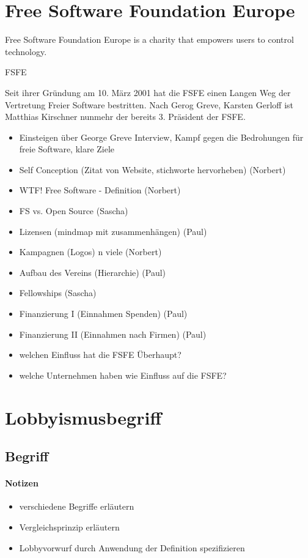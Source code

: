 \newpage
\section{Free Software Foundation Europe}
\epigraph{Free Software Foundation Europe is a charity that empowers users to control technology.}{FSFE}
Seit ihrer Gründung am 10. März 2001 hat die FSFE einen Langen Weg der Vertretung Freier Software bestritten. Nach Gerog Greve, Karsten Gerloff ist Matthias Kirschner nunmehr der bereits 3. Präsident der FSFE.

\begin{itemize}
\setlength\itemsep{0em}
\item Einsteigen über George Greve Interview, Kampf gegen die Bedrohungen für freie Software, klare Ziele
\item Self Conception (Zitat von Website, stichworte hervorheben) (Norbert)
\item WTF! Free Software - Definition (Norbert)
\item FS vs. Open Source (Sascha)
\item Lizensen (mindmap mit zusammenhängen) (Paul)
\item Kampagnen (Logos) n viele (Norbert)
\item Aufbau des Vereins (Hierarchie) (Paul)
\item Fellowships (Sascha)
\item Finanzierung I (Einnahmen Spenden) (Paul)
\item Finanzierung II (Einnahmen nach Firmen) (Paul)
\item welchen Einfluss hat die FSFE Überhaupt?
\item welche Unternehmen haben wie Einfluss auf die FSFE?
\end{itemize}

\section{Lobbyismusbegriff}

\subsection{Begriff}

\paragraph{Notizen}
\begin{itemize}
\item verschiedene Begriffe erläutern
\item Vergleichsprinzip erläutern
\item Lobbyvorwurf durch Anwendung der Definition spezifizieren
\end{itemize}

